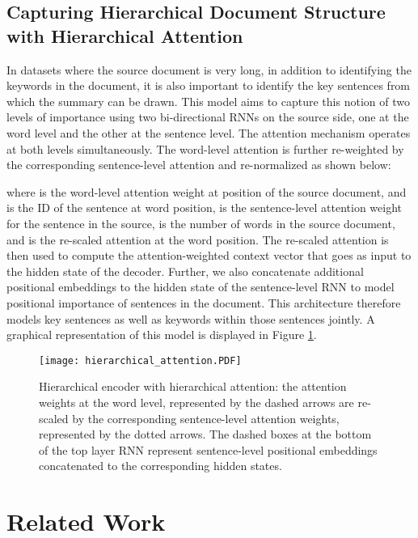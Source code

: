 \documentclass[11pt]{article}
\begin{document}
\subsection{Capturing Hierarchical Document Structure with Hierarchical Attention}\label{sec:hierarchical}
In datasets where the source document is very long, in addition to identifying the keywords in the document, it is also important to identify the key sentences from which the summary can be drawn. This model aims to capture this notion of two levels of importance using two bi-directional RNNs on the source side, one at the word level and the other at the sentence level. The attention mechanism operates at both levels simultaneously. The word-level attention is further re-weighted by the corresponding sentence-level attention and re-normalized as shown below:

where  is the word-level attention weight at  position of the source document, and  is the ID of the sentence at  word position,  is the sentence-level attention weight for the  sentence in the source,  is the number of words in the source document, and  is the re-scaled attention at the   word position. The re-scaled attention is then used to compute the attention-weighted context vector that goes as input to the hidden state of the decoder. Further, we also concatenate additional positional embeddings to the hidden state of the sentence-level RNN to model positional importance of sentences in the document. This architecture therefore models key sentences as well as keywords within those sentences jointly. A graphical representation of this model is displayed in Figure \ref{fig:hierarchical_attention}. 

\begin{figure}[ht]
    \vspace{-0.3in}
	\centering
  \texttt{[image: hierarchical\_attention.PDF]}
  	\vspace{-0.6in}
	\caption{{\small Hierarchical encoder with hierarchical attention: the attention weights at the word level, represented by the dashed arrows are re-scaled by the corresponding sentence-level attention weights, represented by the dotted arrows. The dashed boxes at the bottom of the top layer RNN represent sentence-level positional embeddings concatenated to the corresponding hidden states.}}
	\label{fig:hierarchical_attention}
\end{figure}





 \section{Related Work}\label{sec:related_work}
\end{document}
